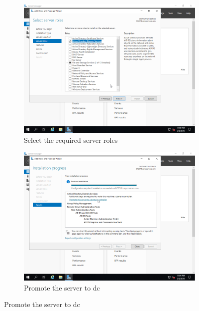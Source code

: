 \begin{figure}[!htb]\ContinuedFloat
	\begin{subfigure}{0.5\textwidth}
		\captionsetup{width=0.8\linewidth}
		\includegraphics[width=0.9\linewidth]{img/Methodologie/Migration17.png}
		\centering
		\caption{Select the required server roles}
	\end{subfigure}
	\begin{subfigure}{0.5\textwidth}
		\captionsetup{width=0.8\linewidth}
		\includegraphics[width=0.9\linewidth]{img/Methodologie/Migration18.png} 
		\centering
		\caption{Promote the server to \acrshort{dc}}
	\end{subfigure}
\end{figure}
